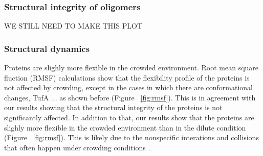 \documentclass[journal=jacsat,manuscript=article]{achemso}
\begin{document}

\subsubsection{Structural integrity of oligomers}

\colorbox{red!50}{WE STILL NEED TO MAKE THIS PLOT}












\subsubsection{Structural dynamics}
Proteins are slighly more flexible in the crowded environment. Root mean square fluction (RMSF) calculations show that the flexibility profile of the proteins is not affected by crowding, except in the cases in which there are conformational changes, TufA ... as shown before (Figure ~\ref{fig:rmsf}). This is in agreement with our results showing that the structural integrity of the proteins is not significantly affected. In addition to that, our results show that the proteins are slighly more flexible in the crowded environment than in the dilute condition (Figure ~\ref{fig:rmsf}). This is likely due to the nonspecific interations and collisions that often happen under crowding conditions \cite{aasd}.
\end{document}
